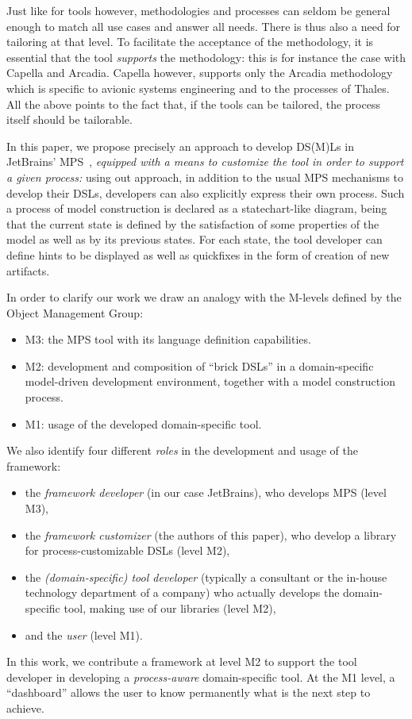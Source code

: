 Just like for tools however, methodologies and processes can seldom be general
enough to match all use cases and answer all needs. There is thus also a need
for tailoring at that level. To facilitate the acceptance of the methodology, it
is essential that the tool \emph{supports} the methodology: this is for instance
the case with Capella and Arcadia.
Capella however, supports only the Arcadia methodology which is specific to
avionic systems engineering and to the processes of Thales.
All the above points to the fact that, if the tools can be tailored, the process
itself should be tailorable.

In this paper, we propose precisely an approach to develop DS(M)Ls in JetBrains'
MPS~\cite{DBLP:conf/pppj/PechSV13}, \emph{equipped with a means to customize the tool in order to support a
given process:} using out approach, in addition to the usual MPS mechanisms to
develop their DSLs, developers can also explicitly express their own process.
Such a process of model construction is declared as a
statechart-like diagram, being that the current state is defined by the
satisfaction of some properties of the model as well as by its previous states.
For each state, the tool developer can define hints to be displayed as well as
quickfixes in the form of creation of new artifacts.

In order to clarify our work we draw an analogy with the M-levels defined by the Object Management Group:
\vspace{-.1cm}
\begin{itemize}
  \item M3: the MPS tool with its language definition capabilities.
  \item M2: development and composition of ``brick DSLs'' in a
  domain-specific model-driven development environment, together with a
  model construction process.
  \item M1: usage of the developed domain-specific tool.
\end{itemize}
\vspace{-.1cm}
We also identify four different \emph{roles} in the development and
usage of the framework:
\vspace{-.1cm}
\begin{itemize}
  \item the \emph{framework developer} (in our case JetBrains), who develops MPS
  (level M3),
  \item the \emph{framework customizer} (the authors of this paper), who develop
  a library for process-customizable DSLs (level M2),
  \item the \emph{(domain-specific) tool developer} 
    (typically a consultant or the in-house technology department of a company)
    who actually develops the domain-specific tool, making use of our libraries (level M2),
  \item and the \emph{user} (level M1).
\end{itemize}
\vspace{-.1cm}
In this work, we contribute a framework at level M2 to support the tool developer
in developing a \emph{process-aware} domain-specific tool.
At the M1 level, a ``dashboard'' allows the user to know permanently what is the
next step to achieve.


